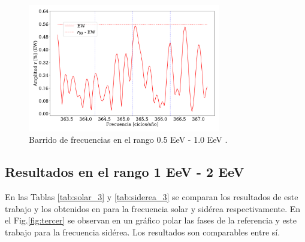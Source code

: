     \begin{figure}[H]
        \begin{small}
            \begin{center}
                \includegraphics[width=0.75\textwidth]{plot_bin_2_barrido_v3_EW.pdf}
            \end{center}
            \caption{Barrido de frecuencias en el  rango 0.5 EeV - 1.0 EeV .}
            \label{fig:segundo_barrido}
        \end{small}
    \end{figure}    


\subsection{Resultados en el rango 1 EeV - 2 EeV}

 
En las Tablas \ref{tab:solar_3} y \ref{tab:siderea_3} se comparan los resultados de este trabajo y los obtenidos en \cite{Aab_2020} para la frecuencia solar y sidérea respectivamente. En el Fig.\ref{fig:tercer} se observan en un gráfico polar las fases de la referencia y este trabajo para la frecuencia sidérea. Los resultados son comparables entre sí.
    
